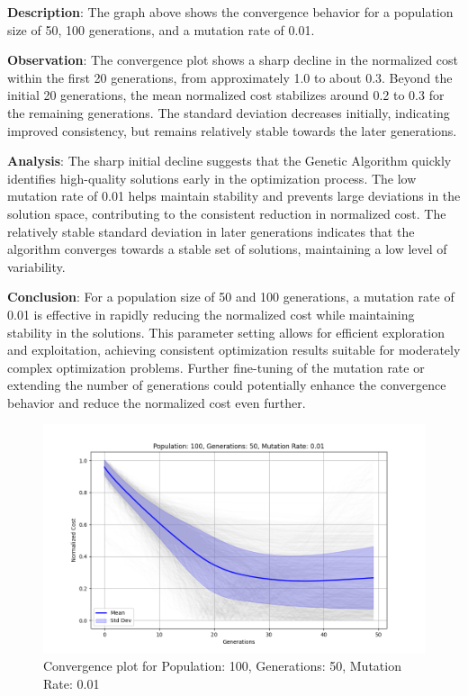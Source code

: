 \documentclass[
]{article}
\begin{document}
    \textbf{Description}: The graph above shows the convergence behavior for a population size of 50, 100 generations, and a mutation rate of 0.01.

    \textbf{Observation}: The convergence plot shows a sharp decline in the normalized cost within the first 20 generations, from approximately 1.0 to about 0.3. Beyond the initial 20 generations, the mean normalized cost stabilizes around 0.2 to 0.3 for the remaining generations. The standard deviation decreases initially, indicating improved consistency, but remains relatively stable towards the later generations.

    \textbf{Analysis}: The sharp initial decline suggests that the Genetic Algorithm quickly identifies high-quality solutions early in the optimization process. The low mutation rate of 0.01 helps maintain stability and prevents large deviations in the solution space, contributing to the consistent reduction in normalized cost. The relatively stable standard deviation in later generations indicates that the algorithm converges towards a stable set of solutions, maintaining a low level of variability.

    \textbf{Conclusion}: For a population size of 50 and 100 generations, a mutation rate of 0.01 is effective in rapidly reducing the normalized cost while maintaining stability in the solutions. This parameter setting allows for efficient exploration and exploitation, achieving consistent optimization results suitable for moderately complex optimization problems. Further fine-tuning of the mutation rate or extending the number of generations could potentially enhance the convergence behavior and reduce the normalized cost even further.

    \begin{figure}[H]
        \centering
        \includegraphics[width=\textwidth]{genetic_algorithm/Population_100_Generations_50_MutationRate_0.01}
        \caption{Convergence plot for Population: 100, Generations: 50, Mutation Rate: 0.01}
        \label{fig:ga_100_50_01}
    \end{figure}
\end{document}
